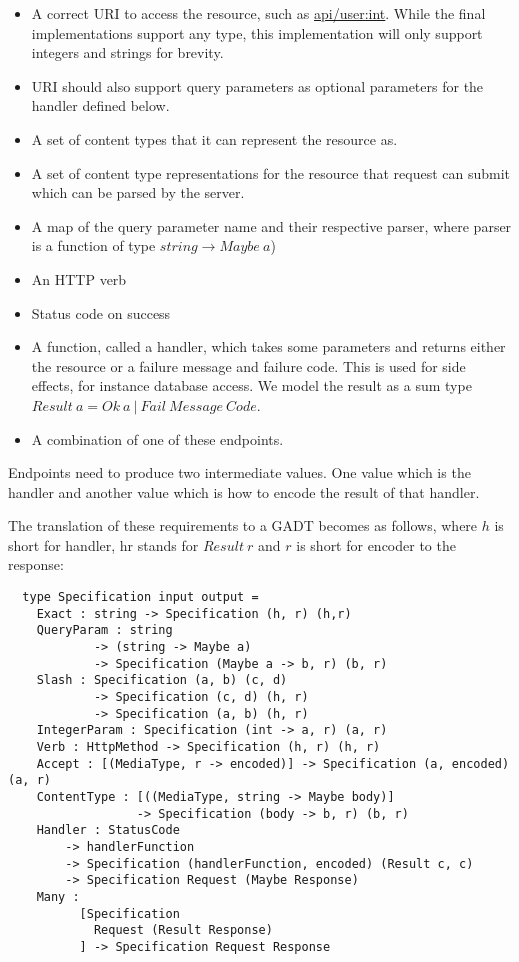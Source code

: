 \begin{itemize}
    \item A correct URI to access the resource, such as \url{api/user:int}.
        While the final implementations support any type, this implementation
        will only support integers and strings for brevity.
    \item URI should also support query parameters as optional parameters for
        the handler defined below.
    \item A set of content types that it can represent the resource as.
    \item A set of content type representations for the resource that request can
        submit which can be parsed by the server.
    \item A map of the query parameter name and their respective parser,
        where parser is a function of type $string \rightarrow Maybe\ a$)
    \item An HTTP verb
    \item Status code on success
    \item A function, called a handler, which takes some parameters and returns
        either the resource or a failure message and failure code. This is used
        for side effects, for instance database access. We model the result as
        a sum type $Result\ a = Ok\ a\ |\ Fail\ Message\ Code$.
    \item A combination of one of these endpoints.
\end{itemize}

Endpoints need to produce two intermediate values. One value which is the
handler and another value which is how to encode the result of that handler.

The translation of these requirements to a GADT becomes as follows, where $h$
is short for handler, hr stands for $Result\ r$ and $r$ is short for encoder to the response:

\begin{lstlisting}
  type Specification input output =
    Exact : string -> Specification (h, r) (h,r)
    QueryParam : string 
            -> (string -> Maybe a) 
            -> Specification (Maybe a -> b, r) (b, r)
    Slash : Specification (a, b) (c, d) 
            -> Specification (c, d) (h, r) 
            -> Specification (a, b) (h, r) 
    IntegerParam : Specification (int -> a, r) (a, r)
    Verb : HttpMethod -> Specification (h, r) (h, r)
    Accept : [(MediaType, r -> encoded)] -> Specification (a, encoded) (a, r)
    ContentType : [((MediaType, string -> Maybe body)]
                  -> Specification (body -> b, r) (b, r)
    Handler : StatusCode 
        -> handlerFunction 
        -> Specification (handlerFunction, encoded) (Result c, c)
        -> Specification Request (Maybe Response)
    Many :
          [Specification 
            Request (Result Response)
          ] -> Specification Request Response
\end{lstlisting}


